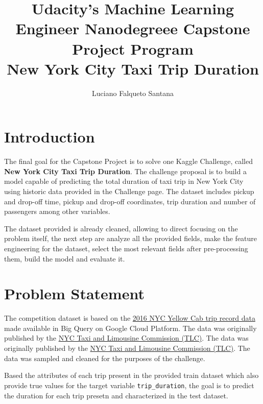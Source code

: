 \documentclass[11pt]{article}
\title{Udacity's Machine Learning Engineer Nanodegreee Capstone Project
Program \\ New York City Taxi Trip Duration}
\author{Luciano Falqueto Santana}
\begin{document}
    
    
    \maketitle
    
    \tableofcontents{}
    
\section{Introduction}

\hspace{0.5cm} 
The final goal for the Capstone Project is to solve one Kaggle Challenge, called \textbf{New York City Taxi Trip Duration}. The challenge proposal is to build a model capable of predicting the total duration of taxi trip in New York City using historic data provided in the Challenge page. The dataset includes pickup and drop-off time, pickup and drop-off coordinates, trip duration and number of passengers among other variables.

The dataset provided is already cleaned, allowing to direct focusing on the problem itself, the next step are analyze all the provided fields, make the feature engineering for the dataset, select the most relevant fields after pre-processing them, build the model and evaluate it.
   

\section{Problem Statement}\label{problem-statement}


\hspace{0.5cm} The competition dataset is based on the \href{https://cloud.google.com/bigquery/public-data/nyc-tlc-trips}{2016
NYC Yellow Cab trip record data} made available in Big Query on Google
Cloud Platform. The data was originally published by the
\href{http://www.nyc.gov/html/tlc/html/about/trip_record_data.shtml}{NYC
Taxi and Limousine Commission (TLC)}. The data was originally published by the
\href{http://www.nyc.gov/html/tlc/html/about/trip_record_data.shtml}{NYC
Taxi and Limousine Commission (TLC)}. \cite{challenge_site} The data was sampled and cleaned for the purposes of the challenge. 

Based the attributes of each trip present in the provided train dataset which also provide true values for the target variable \texttt{trip\_duration}, the goal is to predict the duration for each trip presetn and characterized in the test dataset.
\end{document}
